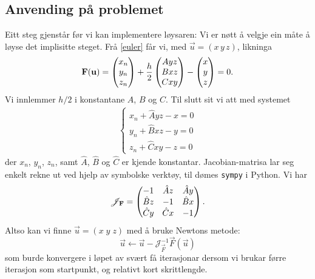\documentclass[12pt]{article}
\begin{document}
\begin{multicols*}{2}
    \subsection*{Anvending på problemet}
    Eitt steg gjenstår før vi kan implementere løysaren:
    Vi er nøtt å velgje ein måte å løyse det implisitte steget.
    Frå \eqref{euler} får vi, med $\vec u = (x \, y \, z)$, likninga
    \begin{equation}
        \label{u_eq}
        \vec F (\vec u) =
        \begin{pmatrix}
            x_n \\ y_n \\ z_n
        \end{pmatrix}
        + \frac h 2
        \begin{pmatrix}
            A y z \\ B x z \\ C x y
        \end{pmatrix}
        -
        \begin{pmatrix}
            x \\ y \\ z
        \end{pmatrix}
        = 0 \text.
    \end{equation}
    Vi innlemmer $h/2$ i konstantane $A$, $B$ og $C$.
    Til slutt sit vi att med systemet
    \begin{align*}
        \left\{
        \begin{array}{c}
            x_n + \hat A y z - x = 0 \\
            y_n + \hat B x z - y = 0 \\
            z_n + \hat C x y - z = 0
        \end{array}
        \right.
    \end{align*}
    der $x_n$, $y_n$, $z_n$,
    samt $\hat A$, $\hat B$ og $\hat C$ er kjende konstantar.
    Jacobian-matrisa lar seg enkelt rekne ut ved hjelp av symbolske
    verktøy, til dømes {\tt sympy} i Python. Vi har
    \[
        \mathscr J_\vec F = \begin{pmatrix}
            -1          &   \hat A z    & \hat A y \\
            \hat B z    &   -1          & \hat B x \\
            \hat C y    &   \hat C x    & -1
        \end{pmatrix} \text.
    \]
    Altso kan vi finne $\vec u = (x \; y\; z)$ med å bruke Newtons metode:
    \[
        \vec u \longleftarrow \vec u - \mathscr J^{-1}_\vec F \vec F(\vec u)
    \]
    som burde konvergere i løpet av svært få iterasjonar dersom vi brukar
    førre iterasjon som startpunkt, og relativt kort skrittlengde.



\end{multicols*}
\end{document}
